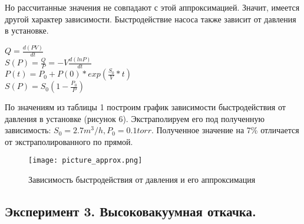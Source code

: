 \documentclass[a4paper]{article}
\begin{document}
Но рассчитанные значения не совпадают с этой аппроксимацией. Значит, имеется другой характер зависимости.
Быстродействие насоса также зависит от давления в установке.

\begin{center}
$Q = \frac{d(PV)}{dt}$\\
$S(P) = \frac{Q}{P}=-V\frac{d(lnP)}{dt}$\\
$P(t) = P_0+P(0)*exp(\frac{S_0}{V}*t)$\\
$S(P) = S_0(1-\frac{P_0}{P})$
\end{center}

По значениям из таблицы 1 построим график зависимости быстродействия от давления в установке (рисунок 6). Экстраполируем его под полученную зависимость: $S_0 = 2.7 m^3/h, P_0 = 0.1 torr$. Полученное значение на 7\% отличается от экстраполированного по прямой.

\begin{figure}[h]
    \centering
    \texttt{[image: picture\_approx.png]}
    \caption{Зависимость быстродействия от давления и его аппроксимация}
    \label{fig:vac}
\end{figure}

\subsection{Эксперимент 3. Высоковакуумная откачка.}
\end{document}
